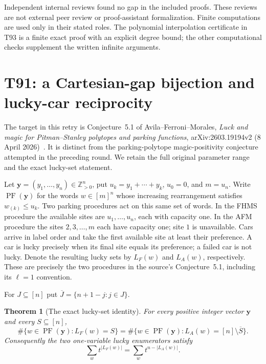 \documentclass[11pt,a4paper]{article}
\newtheorem{theorem}{Theorem}[section]
\theoremstyle{definition}
\theoremstyle{remark}
\begin{document}
Independent internal reviews found no gap in the included proofs. These
reviews are not external peer review or proof-assistant formalization.
Finite computations are used only in their stated roles. The polynomial
interpolation certificate in T93 is a finite exact proof with an explicit
degree bound; the other computational checks supplement the written
infinite arguments.



\section{T91: a Cartesian-gap bijection and lucky-car reciprocity}

The target in this retry is Conjecture~5.1 of Avila--Ferroni--Morales,
\emph{Luck and magic for Pitman--Stanley polytopes and parking functions},
arXiv:2603.19194v2 (8 April 2026)~\cite{RetryAFM2026}. It is distinct from the parking-polytope
magic-positivity conjecture attempted in the preceding round. We retain
the full original parameter range and the exact lucky-set statement.

Let $\mathbf y=(y_1,\ldots,y_n)\in\mathbb Z_{>0}^n$, put
$u_k=y_1+\cdots+y_k$, $u_0=0$, and $m=u_n$. Write
$\operatorname{PF}(\mathbf y)$ for the words $w\in[m]^n$ whose increasing
rearrangement satisfies $w_{(k)}\le u_k$. Two parking procedures act on
this same set of words. In the FHMS procedure the available sites are
$u_1,\ldots,u_n$, each with capacity one. In the AFM procedure the sites
$2,3,\ldots,m$ each have capacity one; site $1$ is unavailable. Cars arrive
in label order and take the first available site at least their preference.
A car is lucky precisely when its final site equals its preference; a
failed car is not lucky. Denote the resulting lucky sets by $L_F(w)$ and
$L_A(w)$, respectively. These are precisely the two procedures in the
source's Conjecture~5.1, including its $\ell=1$ convention.

For $J\subseteq[n]$ put $\overline J=\{n+1-j:j\in J\}$.

\begin{theorem}[The exact lucky-set identity]
For every positive integer vector $\mathbf y$ and every $S\subseteq[n]$,
\[
 \#\{w\in\operatorname{PF}(\mathbf y):L_F(w)=S\}
 =\#\{w\in\operatorname{PF}(\mathbf y):
               L_A(w)=[n]\setminus\overline S\}.
\]
Consequently the two one-variable lucky enumerators satisfy
\[
 \sum_w t^{|L_F(w)|}=\sum_w t^{n-|L_A(w)|}.
\]
\end{theorem}
\end{document}

